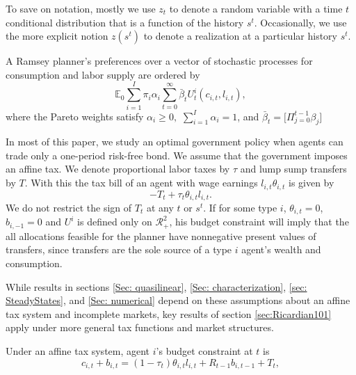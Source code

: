 \documentclass[thmsb,11pt]{article}
\begin{document}
To save on notation, mostly we
use $z_{t}$ to denote a random variable with a time $t$ conditional
distribution that is a function of the history $s^{t}$.
 Occasionally, we use the more explicit notion $z\left(
s^{t}\right) $ to denote a realization  at
a particular history $s^{t}.$


A Ramsey  planner's preferences over a vector of stochastic processes for consumption and
labor supply  are ordered by
\begin{equation}
\mathbb{E}_{0}\sum_{i=1}^{I}\pi _{i}\alpha _{i}\sum_{t=0}^{\infty }\bar{\beta}_t U_{t}^{i}\left( c_{i,t},l_{i,t}\right),  \label{govmt objective}
\end{equation}
where the Pareto weights satisfy $\alpha _{i}\geq 0,$ $\sum_{i=1}^{I}\alpha _{i}=1$, and $\bar{\beta}_t=\bigl[\Pi_{j=0}^{t-1} \beta_j\bigr]$

In most of this paper, we study an optimal  government policy when agents can   trade
only a one-period risk-free bond.  We assume that the government  imposes an
affine tax. We denote proportional labor taxes by $\tau$ and lump sump transfers by $T$. With this the tax bill of an agent with wage earnings $l_{i,t}\theta_{i,t}$ is given by 
\begin{equation*}
- T_t + \tau_t \theta_{i,t}l_{i,t}. \end{equation*}
We do not restrict the sign of $T_{t}$ at any $t$ or $s^t$. %
If for some type $i$, $\theta _{i,t}=0$, $b_{i, -1} = 0$ and $U^i$ is defined only on $\mathcal{R}^2_{+}$, his budget constraint will imply that the all allocations feasible for the planner have nonnegative present values of
transfers, since transfers are the sole source of a type $i$ agent's wealth and consumption.

While results in sections \ref{Sec: quasilinear}, \ref{Sec: characterization}, \ref{sec: SteadyStates}, and  \ref{Sec: numerical}  depend on these  assumptions about an affine tax system and incomplete markets,
  key results of  section  \ref{sec:Ricardian101} apply under  more general tax functions and
market structures.

Under an affine tax system, agent $i$'s budget constraint at $t$ is%
\begin{equation}
c_{i,t}+b_{i,t}=\left( 1-\tau _{t}\right) \theta
_{i,t}l_{i,t}+R_{t-1}b_{i,t-1}+T_{t},  \label{agent bc affine}
\end{equation}
\end{document}
